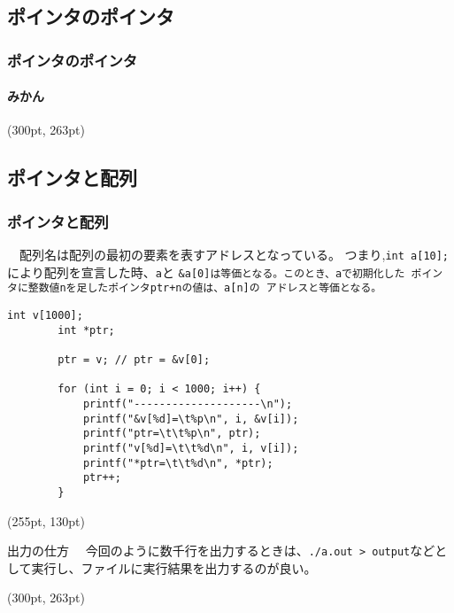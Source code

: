 \documentclass[dvipdfmx]{beamer}
\begin{document}
\subsection{ポインタのポインタ}
\begin{frame}[t, fragile, label=70]
    \frametitle{ポインタのポインタ}
    \framesubtitle{みかん}
    \begin{textblock*}{0.3\linewidth}(300pt, 263pt)
        \hyperlink{69}{}
        \space
        \hyperlink{71}{}
    \end{textblock*}
\end{frame}

\subsection{ポインタと配列}
\begin{frame}[t, fragile, label=71]
    \frametitle{ポインタと配列}
    　配列名は配列の最初の要素を表すアドレスとなっている。
    つまり,\texttt{int a[10];}により配列を宣言した時、\texttt{a}と
    \verb|&|\texttt{a[0]は等価となる。このとき、aで初期化した
    ポインタに整数値nを足したポインタptr+nの値は、a[n]の
    アドレスと等価となる。}
    \begin{lstlisting}[gobble=8, caption=Exercise]
        int v[1000];
        int *ptr;

        ptr = v; // ptr = &v[0];

        for (int i = 0; i < 1000; i++) {
            printf("--------------------\n");
            printf("&v[%d]=\t%p\n", i, &v[i]);
            printf("ptr=\t\t%p\n", ptr);
            printf("v[%d]=\t\t%d\n", i, v[i]);
            printf("*ptr=\t\t%d\n", *ptr);
            ptr++;
        }
    \end{lstlisting}
    \begin{textblock*}{0.3\linewidth}(255pt, 130pt)
        \begin{itembox}[l]{出力の仕方}
            　今回のように数千行を出力するときは、\texttt{./a.out > output}などとして実行し、ファイルに実行結果を出力するのが良い。
        \end{itembox}
    \end{textblock*}
    \begin{textblock*}{0.3\linewidth}(300pt, 263pt)
        \hyperlink{70}{}
        \space
        \hyperlink{72}{}
    \end{textblock*}
\end{frame}
\end{document}
